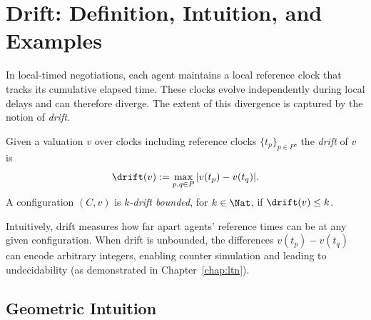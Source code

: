 \section{Drift: Definition, Intuition, and Examples}
\label{sec:drift-def}

In local-timed negotiations, each agent maintains a local reference clock that tracks its cumulative elapsed time. These clocks evolve independently during local delays and can therefore diverge. The extent of this divergence is captured by the notion of \emph{drift}.

\begin{definition}[Drift]
\label{def:drift}
Given a valuation $v$ over clocks including reference clocks $\{t_p\}_{p \in P}$, the \emph{drift} of $v$ is
\[
  \drift(v) := \max_{p,q \in P} |v(t_p) - v(t_q)|.
\]
A configuration $(C,v)$ is \emph{$k$-drift bounded}, for $k\in\Nat$, if $\drift(v) \le k$.
\end{definition}

Intuitively, drift measures how far apart agents' reference times can be at any given configuration. When drift is unbounded, the differences $v(t_p) - v(t_q)$ can encode arbitrary integers, enabling counter simulation and leading to undecidability (as demonstrated in Chapter~\ref{chap:ltn}).

\subsection{Geometric Intuition}

